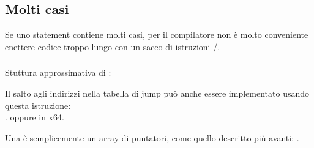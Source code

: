 \subsection{Molti casi}

Se uno statement  contiene molti casi, per il compilatore non è molto conveniente enettere codice troppo lungo con un sacco di 
istruzioni \JE/\JNE.







\subsubsection{\Conclusion{}}

Stuttura approssimativa di :



Il salto agli indirizzi nella tabella di jump può anche essere implementato usando questa istruzione: \\
.
oppure  in x64.

Una  è semplicemente un array di puntatori, come quello descritto più avanti: .
